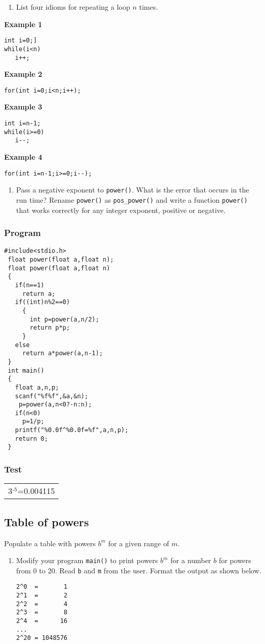 \documentclass[11pt]{article}
\begin{document}
\begin{enumerate}
\item List four idioms for repeating a loop $n$ times.
\end{enumerate}
\textbf{Example 1}
\begin{verbatim}
int i=0;]
while(i<n)
   i++;
\end{verbatim}
\textbf{Example 2}
\begin{verbatim}
for(int i=0;i<n;i++);
\end{verbatim}
\textbf{Example 3}
\begin{verbatim}
int i=n-1;
while(i>=0)
   i--;
\end{verbatim}
\textbf{Example 4}
\begin{verbatim}
for(int i=n-1;i>=0;i--);
\end{verbatim}
\begin{enumerate}
\item Pass a negative exponent to \texttt{power()}. What is the error that
occurs in the run time? Rename \texttt{power()} as \texttt{pos\_power()} and
write a function \texttt{power()} that works correctly for any integer
exponent, positive or negative.
\end{enumerate}
\subsubsection*{Program}
\label{sec-1-4-5}
\begin{verbatim}
#include<stdio.h>
 float power(float a,float n);
 float power(float a,float n)
 {
   if(n==1)
     return a;
   if((int)n%2==0)
     {
       int p=power(a,n/2);
       return p*p;
     }
   else
     return a*power(a,n-1);
 }
 int main()
 {
   float a,n,p;
   scanf("%f%f",&a,&n);
    p=power(a,n<0?-n:n);
   if(n<0)
     p=1/p;
   printf("%0.0f^%0.0f=%f",a,n,p);
   return 0;
 }
\end{verbatim}
\subsubsection*{Test}
\label{sec-1-4-6}
\begin{center}
\begin{tabular}{l}
3$^{\text{-5}}$=0.004115\\
\end{tabular}
\end{center}

\subsection*{Table of powers}
\label{sec-1-5}
Populate a table with powers $b^m$ for a given range of $m$.
\begin{enumerate}
\item Modify your program \texttt{main()} to print powers $b^m$ for a number
$b$ for powers from 0 to 20. Read \texttt{b} and \texttt{m} from the
user. Format the output as shown below.
\begin{verbatim}
2^0  =       1
2^1  =       2
2^2  =       4
2^3  =       8
2^4  =      16
...
2^20 = 1048576
\end{verbatim}
\end{enumerate}
\end{document}
